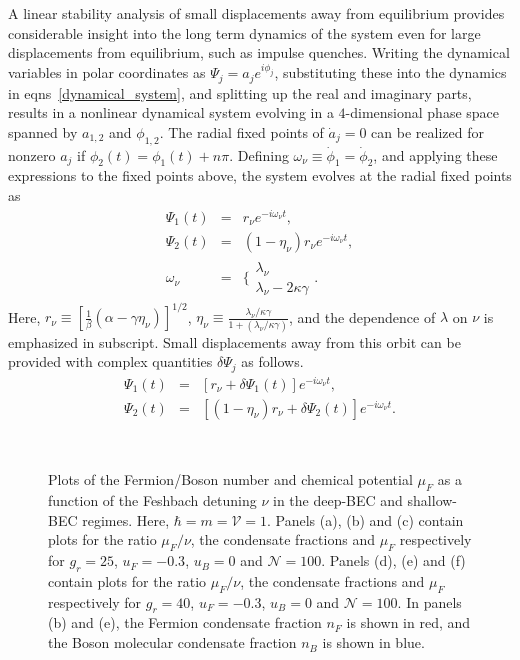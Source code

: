 \documentclass[a4paper,10pt]{report}
\begin{document}
A linear stability analysis of small displacements away from equilibrium provides considerable insight into the long term dynamics of the system even for large displacements from equilibrium, such as impulse quenches.  Writing the dynamical variables in polar coordinates as $\Psi_j = a_j e^{i\phi_j}$, substituting these into the dynamics in eqns~\ref{dynamical_system}, and splitting up the real and imaginary parts, results in a nonlinear dynamical system evolving in a $4$-dimensional phase space spanned by $a_{1,2}$ and $\phi_{1,2}$. The radial fixed points of $\dot{a}_j=0$ can be realized for nonzero $a_j$ if $\phi_2(t) = \phi_1(t)+n\pi$.  Defining $\omega_\nu\equiv\dot{\phi}_1=\dot{\phi}_2$, and applying these expressions to the fixed points above, the system evolves at the radial fixed points as
\begin{eqnarray}
 \Psi_1(t) &=& r_\nu e^{-i\omega_\nu t},\nonumber \\
 \Psi_2(t) &=& (1-\eta_\nu)r_\nu e^{-i\omega_\nu t},\nonumber \\
\omega_\nu &=& \bigg\{\begin{array}{l}
                         \lambda_\nu\\
			 \lambda_\nu - 2\kappa\gamma 
                       \end{array}.
\end{eqnarray}
Here, $r_\nu \equiv\left[\frac{1}{\beta}\left(\alpha -\gamma\eta_\nu \right)\right]^{1/2}$, $\eta_\nu\equiv\frac{\lambda_\nu/\kappa\gamma}{1+\left(\lambda_\nu/\kappa\gamma\right)}$, and the dependence of $\lambda$ on $\nu$ is emphasized in subscript. Small displacements away from this orbit can be provided with complex quantities $\delta\Psi_j$ as follows. 
\begin{eqnarray}
 \Psi_1(t) &=& \left[r_\nu + \delta\Psi_1(t)\right]e^{-i\omega_\nu t},\nonumber \\
 \Psi_2(t) &=& \left[\left(1-\eta_\nu\right)r_\nu + \delta\Psi_2(t)\right]e^{-i\omega_\nu t}.
\end{eqnarray}
\begin{figure}[h!bt]
\ 
\caption{Plots of the  Fermion/Boson number and  chemical potential $\mu_F$  as a function of the Feshbach detuning $\nu$ in the deep-BEC and shallow-BEC regimes. Here, $\hbar = m =\mathcal{V} = 1$. Panels (a), (b) and (c) contain plots for the ratio $\mu_F/\nu$, the condensate fractions and $\mu_F$ respectively for $g_r=25$, $u_F = -0.3$, $u_B = 0$  and $\mathcal{N} = 100$. Panels (d), (e) and (f) contain plots for the ratio $\mu_F/\nu$, the condensate fractions and $\mu_F$ respectively for $g_r=40$, $u_F = -0.3$, $u_B = 0$  and $\mathcal{N} = 100$. In panels (b) and (e), the Fermion condensate fraction $n_F$ is shown in red, and the Boson molecular condensate fraction $n_B$  is shown in blue.}
\label{fig:chempot}
\end{figure}
\end{document}
